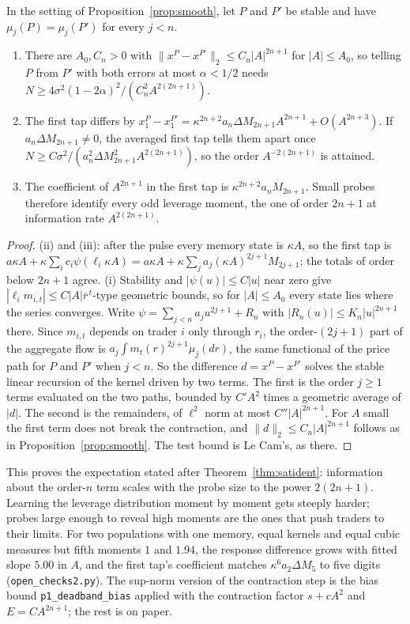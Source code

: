 \begin{proposition}\label{prop:smoothn}
In the setting of Proposition~\ref{prop:smooth}, let $P$ and $P'$ be stable and have $\mu_j(P)=\mu_j(P')$ for every $j<n$.
\begin{enumerate}[label=(\roman*),itemsep=1pt]
\item There are $A_0,C_n>0$ with $\|x^P-x^{P'}\|_2\le C_n|A|^{2n+1}$ for $|A|\le A_0$, so telling $P$ from $P'$ with both errors at most $\alpha<1/2$ needs $N\ge4\sigma^2(1-2\alpha)^2/(C_n^2A^{2(2n+1)})$.
\item The first tap differs by $x^P_1-x^{P'}_1=\kappa^{2n+2}a_n\Delta M_{2n+1}A^{2n+1}+O(A^{2n+3})$. If $a_n\Delta M_{2n+1}\ne0$, the averaged first tap tells them apart once $N\ge C\sigma^2/(a_n^2\Delta M_{2n+1}^2A^{2(2n+1)})$, so the order $A^{-2(2n+1)}$ is attained.
\item The coefficient of $A^{2n+1}$ in the first tap is $\kappa^{2n+2}a_nM_{2n+1}$. Small probes therefore identify every odd leverage moment, the one of order $2n+1$ at information rate $A^{2(2n+1)}$.
\end{enumerate}
\end{proposition}

\begin{proof}
(ii) and (iii): after the pulse every memory state is $\kappa A$, so the first tap is $a\kappa A+\kappa\sum_ic_i\psi(\ell_i\kappa A)=a\kappa A+\kappa\sum_ja_j(\kappa A)^{2j+1}M_{2j+1}$; the totals of order below $2n+1$ agree. (i) Stability and $|\psi(u)|\le C|u|$ near zero give $|\ell_im_{i,t}|\le C|A|\bar r^{\,t}$-type geometric bounds, so for $|A|\le A_0$ every state lies where the series converges. Write $\psi=\sum_{j<n}a_ju^{2j+1}+R_n$ with $|R_n(u)|\le K_n|u|^{2n+1}$ there. Since $m_{i,t}$ depends on trader $i$ only through $r_i$, the order-$(2j+1)$ part of the aggregate flow is $a_j\int m_t(r)^{2j+1}\mu_j(dr)$, the same functional of the price path for $P$ and $P'$ when $j<n$. So the difference $d=x^P-x^{P'}$ solves the stable linear recursion of the kernel driven by two terms. The first is the order $j\ge1$ terms evaluated on the two paths, bounded by $C'A^2$ times a geometric average of $|d|$. The second is the remainders, of $\ell^2$ norm at most $C''|A|^{2n+1}$. For $A$ small the first term does not break the contraction, and $\|d\|_2\le C_n|A|^{2n+1}$ follows as in Proposition~\ref{prop:smooth}. The test bound is Le Cam's, as there.
\end{proof}

This proves the expectation stated after Theorem~\ref{thm:satident}: information about the order-$n$ term scales with the probe size to the power $2(2n+1)$. Learning the leverage distribution moment by moment gets steeply harder; probes large enough to reveal high moments are the ones that push traders to their limits. For two populations with one memory, equal kernels and equal cubic measures but fifth moments $1$ and $1.94$, the response difference grows with fitted slope $5.00$ in $A$, and the first tap's coefficient matches $\kappa^6a_2\Delta M_5$ to five digits (\nolinkurl{open_checks2.py}). The sup-norm version of the contraction step is the bias bound \texttt{p1\_deadband\_bias} applied with the contraction factor $s+cA^2$ and $E=CA^{2n+1}$; the rest is on paper.

